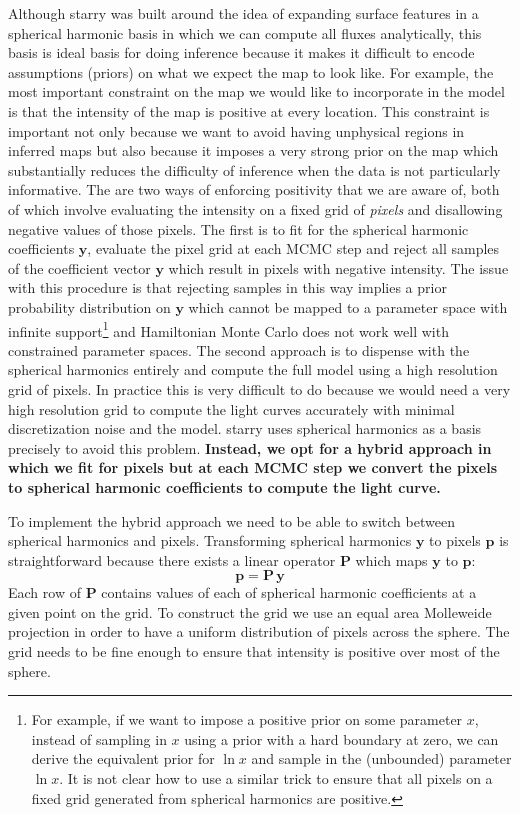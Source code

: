 \documentclass[modern]{aastex62}
\begin{document}
Although \textsf{starry} was built around the idea of expanding surface features in a spherical harmonic basis in which we can compute all fluxes analytically, this basis is ideal basis for doing inference because it makes it difficult to encode assumptions (priors) on what we expect the map to look like.
For example, the most important constraint on the map we would like to incorporate in the model is that the intensity of the map is positive at every location. 
This constraint is important not only because we want to avoid having unphysical regions in inferred maps but also because it imposes a very strong prior on the map which substantially reduces the difficulty of inference when the data is not particularly informative.
The are two ways of enforcing positivity that we are aware of, both of which involve evaluating the intensity on a fixed grid of \emph{pixels} and disallowing negative values of those pixels.
The first is to fit for the spherical harmonic coefficients $\mathbf{y}$, evaluate the pixel grid at each MCMC step and reject all samples of the coefficient vector $\mathbf{y}$ which result in pixels with negative intensity.
The issue with this procedure is that rejecting samples in this way implies a prior probability distribution on $\mathbf{y}$ which cannot be mapped to a parameter space with infinite support\footnote{For example, if we want to impose a positive prior on some parameter $x$, instead of sampling in $x$ using a prior with a hard boundary at zero, we can derive the equivalent prior for $\ln x$ and sample in the (unbounded) parameter $\ln x$.
It is not clear how to use a similar trick to ensure that all pixels on a fixed grid generated from spherical harmonics are positive.} and Hamiltonian Monte Carlo does not work well with constrained parameter spaces.
The second approach is to dispense with the spherical harmonics entirely and compute the full model using a high resolution grid of pixels.
In practice this is very difficult to do because we would need a very high resolution grid to compute the light curves accurately with minimal discretization noise and the model.  
\textsf{starry} uses spherical harmonics as a basis precisely to avoid this problem.
\textbf{Instead, we opt for a hybrid approach in which we fit for pixels but at each MCMC step we convert the pixels to spherical harmonic coefficients to compute the light curve.}

To implement the hybrid approach we need to be able to switch between spherical harmonics and pixels.
Transforming spherical harmonics $\mathbf{y}$ to pixels $\mathbf{p}$ is straightforward because there exists a linear operator $\mathbf{P}$ which maps $\mathbf{y}$ to $\mathbf{p}$:
\begin{equation}
    \mathbf{p}=\mathbf{P}\,\mathbf{y}
    \label{eq:ylms_to_pixels}
\end{equation}
Each row of $\mathbf{P}$ contains values of each of spherical harmonic coefficients at a given point on the grid. 
To construct the grid we use an equal area Molleweide projection in order to have a uniform distribution of pixels across the sphere.
The grid needs to be fine enough to ensure that intensity is positive over most of the sphere.
\end{document}
